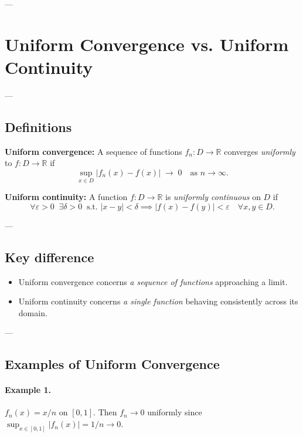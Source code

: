 \documentclass[11pt,a4paper]{article}
\begin{document}
	---
	

	
	\section*{Uniform Convergence vs. Uniform Continuity}
	
	---
	
	\subsection*{Definitions}
	
	\textbf{Uniform convergence:}  
	A sequence of functions $f_n:D\to\mathbb{R}$ converges \emph{uniformly} to $f:D\to\mathbb{R}$ if
	\[
	\sup_{x\in D} |f_n(x)-f(x)| \;\to\; 0 \quad \text{as } n\to\infty.
	\]
	
	\textbf{Uniform continuity:}  
	A function $f:D\to\mathbb{R}$ is \emph{uniformly continuous} on $D$ if
	\[
	\forall \varepsilon>0 \;\; \exists \delta>0 \;\; \text{s.t. } |x-y|<\delta \implies |f(x)-f(y)|<\varepsilon \quad \forall x,y\in D.
	\]
	
	---
	
	\subsection*{Key difference}
	\begin{itemize}
		\item Uniform convergence concerns \emph{a sequence of functions} approaching a limit.
		\item Uniform continuity concerns \emph{a single function} behaving consistently across its domain.
	\end{itemize}
	
	---
	
	\subsection*{Examples of Uniform Convergence}
	
	\paragraph{Example 1.} $f_n(x)=x/n$ on $[0,1]$.  
	Then $f_n\to 0$ uniformly since $\sup_{x\in[0,1]}|f_n(x)|=1/n\to 0$.
	
	
\end{document}
